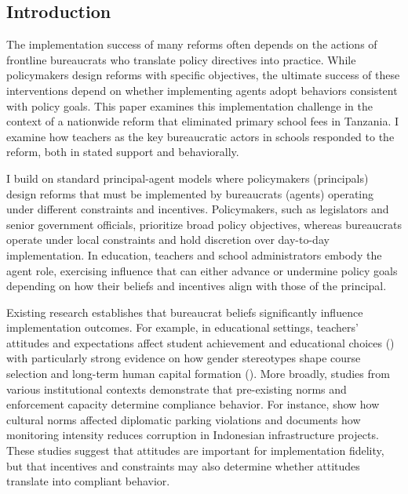 \documentclass[hidelinks,12pt]{article}
\begin{document}
\begin{singlespace}
\onehalfspacing

\section{Introduction}
\hspace{1em} The implementation success of many reforms often depends on the actions of frontline bureaucrats who translate policy directives into practice. While policymakers design reforms with specific objectives, the ultimate success of these interventions depend on whether implementing agents adopt behaviors consistent with policy goals. This paper examines this implementation challenge in the context of a nationwide reform that eliminated primary school fees in Tanzania. I examine how teachers as the key bureaucratic actors in schools responded to the reform, both in stated support and behaviorally.

I build on standard principal-agent models where policymakers (principals) design reforms that must be implemented by bureaucrats (agents) operating under different constraints and incentives. Policymakers, such as legislators and senior government officials, prioritize broad policy objectives, whereas bureaucrats operate under local constraints and hold discretion over day-to-day implementation. In education, teachers and school administrators embody the agent role, exercising influence that can either advance or undermine policy goals depending on how their beliefs and incentives align with those of the principal.

Existing research establishes that bureaucrat beliefs significantly influence implementation outcomes. For example, in educational settings, teachers' attitudes and expectations affect student achievement and educational choices (\cite{sabarwal_teacher_2022,fives_teachers_2016,liou_climate_2021}) with particularly strong evidence on how gender stereotypes shape course selection and long-term human capital formation (\cite{lavy_gender_2008,lavy_origins_2018}). More broadly, studies from various institutional contexts demonstrate that pre-existing norms and enforcement capacity determine compliance behavior. For instance, \textcite{fisman_corruption_2007} show how cultural norms affected diplomatic parking violations and \textcite{olken_monitoring_2007} documents how monitoring intensity reduces corruption in Indonesian infrastructure projects. These studies suggest that attitudes are important for implementation fidelity, but that incentives and constraints may also determine whether attitudes translate into compliant behavior.


\end{singlespace}
\end{document}
